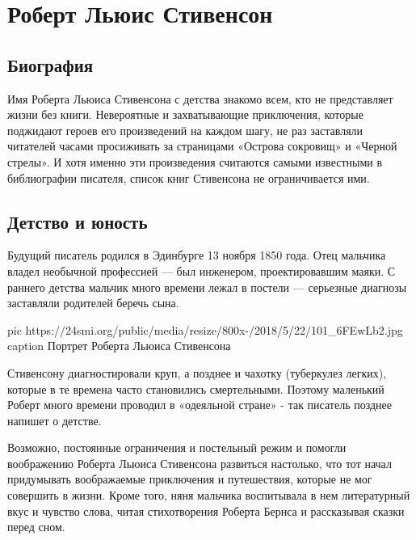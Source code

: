 
 
 

\section{Роберт Льюис Стивенсон}
\label{sec:writers.stevenson_louis_robert}

\subsection{Биография}

Имя Роберта Льюиса Стивенсона с детства знакомо всем, кто не представляет
жизни без книги. Невероятные и захватывающие приключения, которые
поджидают героев его произведений на каждом шагу, не раз заставляли
читателей часами просиживать за страницами «Острова сокровищ» и «Черной
стрелы». И хотя именно эти произведения считаются самыми известными в
библиографии писателя, список книг Стивенсона не ограничивается ими.

\subsection{Детство и юность}

Будущий писатель родился в Эдинбурге 13 ноября 1850 года. Отец мальчика
владел необычной профессией --- был инженером, проектировавшим маяки. С
раннего детства мальчик много времени лежал в постели --- серьезные диагнозы
заставляли родителей беречь сына.

\ifcmt
pic https://24smi.org/public/media/resize/800x-/2018/5/22/101_6FEwLb2.jpg
caption Портрет Роберта Льюиса Стивенсона
\fi

Стивенсону диагностировали круп, а позднее и чахотку (туберкулез легких),
которые в те времена часто становились смертельными. Поэтому маленький Роберт
много времени проводил в «одеяльной стране» - так писатель позднее напишет о
детстве.

Возможно, постоянные ограничения и постельный режим и помогли воображению
Роберта Льюиса Стивенсона развиться настолько, что тот начал придумывать
воображаемые приключения и путешествия, которые не мог совершить в жизни.
Кроме того, няня мальчика воспитывала в нем литературный вкус и чувство слова,
читая стихотворения Роберта Бернса и рассказывая сказки перед сном.

